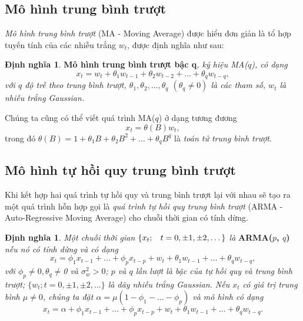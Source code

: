 \documentclass[12pt, a4paper,oneside]{book}
\theoremstyle{definition}
\newtheorem{dn}[theo]{Định nghĩa}
\begin{document}
\subsection{Mô hình trung bình trượt}
\textit{Mô hình trung bình trượt} (MA - Moving Average) được hiểu đơn giản là tổ hợp tuyến tính của các nhiễu trắng $w_t$, được định nghĩa như sau:

\begin{dn}\cite{1} \textbf{Mô hình trung bình trượt bậc q}\textit{, ký hiệu MA($q$), có dạng
		\begin{equation}
		x_{t}= w_{t}+\theta_{1}w_{t-1}+ \theta_{2}w_{t-2}+ \dots+\theta_{q}w_{t-q}, \label{ct1.100}
		\end{equation}
		với $q$ độ trễ theo trung bình trượt, $\theta_{1}, \theta_{2},\dots, \theta_{q}$  $(\theta_{q} \neq 0)$ là các tham số, $w_{t}$ là nhiễu trắng Gaussian.}
\end{dn}
Chúng ta cũng có thể viết quá trình MA($q$) ở dạng tương đương
\begin{equation}
x_{t}= \theta(B)w_{t}, \label{ct1.101}
\end{equation}
trong đó $ \theta(B)= 1+\theta_{1}B+\theta_{2}B^{2}+\dots+ \theta_{q}B^{q}$ là \textit{toán tử trung bình trượt}.

\subsection{Mô hình tự hồi quy trung bình trượt}
Khi kết hợp hai quá trình tự hồi quy và trung bình trượt lại với nhau sẽ tạo ra một quá trình hỗn hợp gọi là \textit{quá trình tự hồi quy trung bình trượt} (ARMA - Auto-Regressive Moving Average) cho chuỗi thời gian có tính dừng.
\begin{dn}\cite{1} 
	\textit{Một chuỗi thời gian $\{x_{t}; \hspace{0.3cm} t=0,\pm1,\pm2, \dots\}$ là} \textbf{ARMA($p$, $q$)} \textit{nếu nó có tính dừng và có dạng
		\begin{equation}
		x_{t}= \phi_{1}x_{t-1}+ \dots+\phi_{p}x_{t-p} + w_{t} + \theta_{1}w_{t-1}+ \dots+ \theta_{q}w_{t-q}, \label{ct1.104}
		\end{equation}
		với $\phi_{p} \neq 0, \theta_q \neq $0 và $\sigma_{w}^{2}> 0$; $p$ và $q$ lần lượt là bậc của tự hồi quy và trung bình trượt; $\{w_{t}; t = 0, \pm 1, \pm 2, \dots\}$ là dãy nhiễu trắng Gaussian. Nếu $x_{t}$ có giá trị trung bình $\mu \neq 0$, chúng ta đặt $\alpha = \mu(1 − \phi_{1} -\dots- \phi_{p})$ và mô hình có dạng
		\begin{equation}
		x_{t}= \alpha + \phi_{1}x_{t-1}+\dots+\phi_{p}x_{t-p}+w_{t}+\theta_{1}w_{t-1}+\dots+\theta_{q}w_{t-q}. \label{ct1.105}	
		\end{equation}}
\end{dn}
\end{document}
